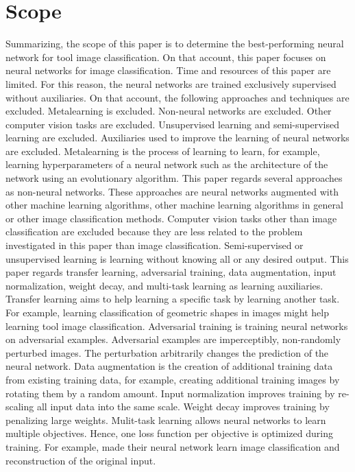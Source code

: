 \section{Scope}
\label{sec:scope}
Summarizing, the scope of this paper is to determine the best-performing neural network for tool image classification. On that account, this paper focuses on neural networks for image classification. 
Time and resources of this paper are limited. For this reason, the neural networks are trained exclusively supervised without auxiliaries.
On that account, the following approaches and techniques are excluded. Metalearning is excluded. Non-neural networks are excluded. Other computer vision tasks are excluded. Unsupervised learning and semi-supervised learning are excluded. Auxiliaries used to improve the learning of neural networks are excluded. 
Metalearning is the process of learning to learn, for example, learning hyperparameters of a neural network such as the architecture of the network using an evolutionary algorithm. \autocite{Schaul.2010}
This paper regards several approaches as non-neural networks. These approaches are neural networks augmented with other machine learning algorithms, other machine learning algorithms in general or other image classification methods.
Computer vision tasks other than image classification are excluded because they are less related to the problem investigated in this paper than image classification.
Semi-supervised or unsupervised learning is learning without knowing all or any desired output. \autocite{ElAmir.2020}
This paper regards transfer learning, adversarial training, data augmentation, input normalization, weight decay, and multi-task learning as learning auxiliaries. 
Transfer learning aims to help learning a specific task by learning another task. For example, learning classification of geometric shapes in images might help learning tool image classification. 
\autocite{Pan.2010}
Adversarial training is training neural networks on adversarial examples. Adversarial examples are imperceptibly, non-randomly perturbed images. The perturbation arbitrarily changes the prediction of the neural network. \autocite{Szegedy.2014}
Data augmentation is the creation of additional training data from existing training data, for example, creating additional training images by rotating them by a random amount. 
\autocite{ElAmir.2020}
Input normalization improves training by re-scaling all input data into the same scale. 
\autocite{ElAmir.2020}
Weight decay improves training by penalizing large weights. 
\autocite{ElAmir.2020}
Mulit-task learning allows neural networks to learn multiple objectives. Hence, one loss function per objective is optimized during training.\autocite{Caruana.1997} For example, \cite{Sabour.2017} made their neural network learn image classification and reconstruction of the original input.

